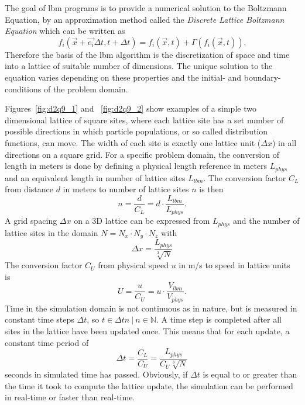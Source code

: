 The goal of \gls{lbm} programs is to provide a numerical solution to the Boltzmann Equation, by an approximation method called the \textit{Discrete Lattice Boltzmann Equation} which can be written as~\cites[pg.58]{Delbosc}
\begin{equation} \label{eq:dbe}
f_i(\vec{x} + \vec{e_i}\Delta t, t + \Delta t) = f_i(\vec{x}, t) + \Gamma(f_i(\vec{x}, t)).
\end{equation}
Therefore the basis of the \gls{lbm} algorithm is the discretization of space and time into a lattice of suitable number of dimensions. The unique solution to the equation varies depending on these properties and the initial- and boundary-conditions of the problem domain.

Figures~\ref{fig:d2q9_1} and ~\ref{fig:d2q9_2} show examples of a simple two dimensional lattice of square sites, where each lattice site has a set number of possible directions in which particle populations, or so called distribution functions, can move. The width of each site is exactly one lattice unit ($\Delta x$) in all directions on a square grid. 
For a specific problem domain, the conversion of length in meters is done by defining a physical length reference in meters $L_{phys}$ and an equivalent length in number of lattice sites $L_{lbm}$. The conversion factor $C_L$ from distance $d$ in meters to number of lattice sites $n$ is then 
\begin{equation}
n = \frac{d}{C_L} = d \cdot \frac{L_{lbm}}{L_{phys}}.
\end{equation}
A grid spacing $\Delta x$ on a 3D lattice can be expressed from $L_{phys}$ and the number of lattice sites in the domain $N = N_x \cdot N_y \cdot N_z$ with
\begin{equation}
\Delta x = \frac{L_{phys}}{\sqrt[3]{N}}
\end{equation}
The conversion factor $C_U$ from physical speed $u$ in m/s to speed in lattice units is~\cites[115]{Delbosc}
\begin{equation}
U = \frac{u}{C_U} = u \cdot \frac{V_{lbm}}{V_{phys}}.
\end{equation}
Time in the simulation domain is not continuous as in nature, but is measured in constant time steps $\Delta t$, so $t \in \Delta t n~|~n \in \mathbb{N}$. A time step is completed after all sites in the lattice have been updated once. This means that for each update, a constant time period of
\begin{equation}
\Delta t = \frac{C_L}{C_U} = \frac{L_{phys}}{C_U \sqrt[3]{N}}
\end{equation}
seconds in simulated time has passed. Obviously, if $\Delta t$ is equal to or greater than the time it took to compute the lattice update, the simulation can be performed in real-time or faster than real-time.

